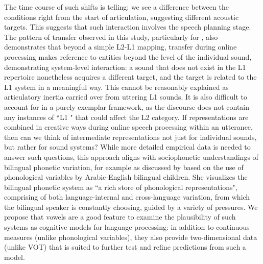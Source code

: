 \documentclass[12 pt]{article}
\newcommand{\nt}[1]{\textipa{[#1]}} %
\begin{document}
The time course of such shifts is telling: we see a difference between the conditions right from the start of articulation, suggesting different acoustic targets. This suggests that such interaction involves the speech planning stage. The pattern of transfer observed in this study, particularly for \nt{2}, also demonstrates that beyond a simple L2-L1 mapping, transfer during online processing makes reference to entities beyond the level of the individual sound, demonstrating system-level interaction: a sound that does not exist in the L1 repertoire nonetheless acquires a different target, and the target is related to the L1 system in a meaningful way. This cannot be reasonably explained as articulatory inertia carried over from uttering L1 sounds. It is also difficult to account for in a purely exemplar framework, as the discourse does not contain any instances of ``L1 \nt{2}" that could affect the L2 category. If representations are combined in creative ways during online speech processing within an utterance, then can we think of intermediate representations not just for individual sounds, but rather for sound systems? While more detailed empirical data is needed to answer such questions, this approach aligns with sociophonetic understandings of bilingual phonetic variation, for example as discussed by \cite{khattab2009phonetic,khattab2013phonetic} based on the use of phonological variables by Arabic-English bilingual children. She visualizes the bilingual phonetic system as ``a rich store of phonological representations", comprising of both language-internal and cross-language variation, from which the bilingual speaker is constantly choosing, guided by a variety of pressures. We propose that vowels are a good feature to examine the plausibility of such systems as cognitive models for language processing: in addition to continuous measures (unlike phonological variables), they also provide two-dimensional data (unlike VOT) that is suited to further test and refine predictions from such a model.
\end{document}
